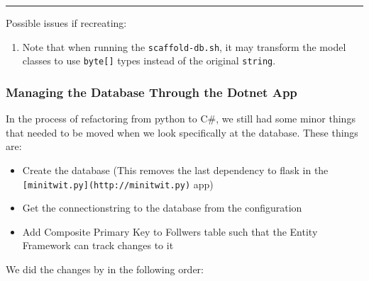 \begin{center}\rule{0.5\linewidth}{0.5pt}\end{center}

Possible issues if recreating:

\begin{enumerate}
    \item Note that when running the \texttt{scaffold-db.sh}, it may transform the model classes to use \texttt{byte{[}{]}} types instead of the original \texttt{string}.
\end{enumerate}

\subsubsection{Managing the Database Through the Dotnet App}
\label{log:managing-the-database-through-the-dotnet-app}

In the process of refactoring from python to C\#, we still had some
minor things that needed to be moved when we look specifically at the
database. These things are:

\begin{itemize}
    \item Create the database (This removes the last dependency to flask in the \texttt{{[}minitwit.py{]}(http://minitwit.py)} app)
    \item Get the connectionstring to the database from the configuration
    \item Add Composite Primary Key to Follwers table such that the Entity Framework can track changes to it
\end{itemize}

We did the changes by in the following order:

